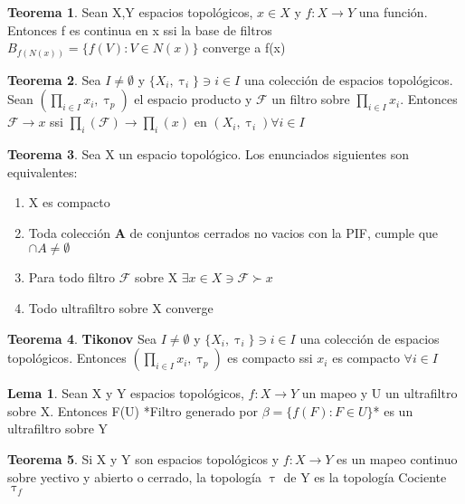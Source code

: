 \documentclass{article}
\theoremstyle{definition}
\newtheorem{theorem}{Teorema}[section]
\newtheorem{lemma}{Lema}[section]
\begin{document}

\begin{theorem}
	Sean X,Y espacios topológicos, $x\in X$  y $f:X\to Y$ una función. Entonces f es continua en x ssi la base de filtros $B_{f(N(x))}=\{f(V):V\in N(x)\}$ converge a f(x)
\end{theorem}


\begin{theorem}
	Sea $I\neq\emptyset$ y $\{X_i,\uptau_i\}\ni i\in I$ una colección de espacios topológicos. Sean $(\prod_{i\in I}x_i,\uptau_p)$ el espacio producto y $\mathcal{F}$ un filtro sobre $\prod_{i\in I}x_i$. Entonces $\mathcal{F}\to x$ ssi $\prod_{i}(\mathcal{F})\to \prod_i(x)$ en $(X_i,\uptau_i) \forall i\in I$
\end{theorem}


\begin{theorem}
	Sea X un espacio topológico. Los enunciados siguientes son equivalentes:
	\begin{enumerate}
		\item X es compacto
		\item Toda colección \textbf{A} de conjuntos cerrados no vacios con la PIF, cumple que $\cap A\neq\emptyset$
		\item Para todo filtro $\mathcal{F}$ sobre X $\exists x\in X\ni \mathcal{F} \succ x$
		\item Todo ultrafiltro sobre X converge
	\end{enumerate}
\end{theorem}


\begin{theorem}\textbf{Tikonov}
	Sea $I\neq\emptyset$ y $\{X_i,\uptau_i\}\ni i\in I$ una colección de espacios topológicos. Entonces $(\prod_{i\in I}x_i,\uptau_p)$ es compacto ssi $x_i$ es compacto $\forall i \in I$
\end{theorem}


\begin{lemma}
	Sean X y Y espacios topológicos, $f:X\to Y$ un mapeo y U un ultrafiltro sobre X. Entonces F(U) *Filtro generado por $\beta = \{f(F):F\in U\}$* es un ultrafiltro sobre Y
\end{lemma}


\begin{theorem}
	Si X y Y son espacios topológicos y $f:X\to Y$ es un mapeo continuo sobre yectivo y abierto o cerrado, la topología $\uptau$ de Y es la topología Cociente $\uptau_f$
\end{theorem}
\end{document}
